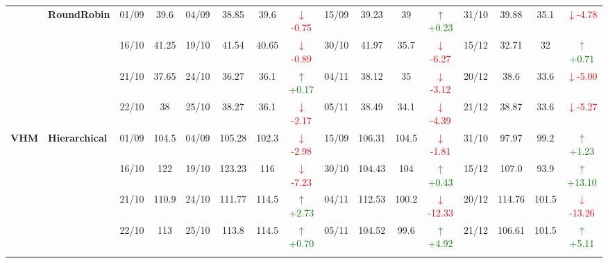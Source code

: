 {\begin{longtable}{llcc|cccc|cccc|cccc}
& \textbf{RoundRobin}
& 01/09 & 39.6 & 04/09 & 38.85 & 39.6 & \textcolor{red}{\(\downarrow\)-0.75} & 15/09 & 39.23 & 39 & \textcolor{green}{\(\uparrow\)+0.23} & 31/10 & 39.88 & 35.1 & \textcolor{red}{\(\downarrow\)-4.78} \\

&
& 16/10 & 41.25 & 19/10 & 41.54 & 40.65 & \textcolor{red}{\(\downarrow\)-0.89} & 30/10 & 41.97 & 35.7 & \textcolor{red}{\(\downarrow\)-6.27} & 15/12 & 32.71 & 32 & \textcolor{green}{\(\uparrow\)+0.71} \\

&
& 21/10 & 37.65 & 24/10 & 36.27 & 36.1 & \textcolor{green}{\(\uparrow\)+0.17} & 04/11 & 38.12 & 35 & \textcolor{red}{\(\downarrow\)-3.12} & 20/12 & 38.6 & 33.6 & \textcolor{red}{\(\downarrow\)-5.00} \\

&
& 22/10 & 38 & 25/10 & 38.27 & 36.1 & \textcolor{red}{\(\downarrow\)-2.17} & 05/11 & 38.49 & 34.1 & \textcolor{red}{\(\downarrow\)-4.39} & 21/12 & 38.87 & 33.6 & \textcolor{red}{\(\downarrow\)-5.27} \\
\midrule




\multirow{12}{*}{\textbf{VHM}} 
& \textbf{Hierarchical}
& 01/09 & 104.5 & 04/09 & 105.28 & 102.3 & \textcolor{red}{\(\downarrow\)-2.98} & 15/09 & 106.31 & 104.5 & \textcolor{red}{\(\downarrow\)-1.81} & 31/10 & 97.97 & 99.2 & \textcolor{green}{\(\uparrow\)+1.23} \\

&
& 16/10 & 122 & 19/10 & 123.23 & 116 & \textcolor{red}{\(\downarrow\)-7.23} & 30/10 & 104.43 & 104 & \textcolor{green}{\(\uparrow\)+0.43} & 15/12 & 107.0 & 93.9 & \textcolor{green}{\(\uparrow\)+13.10} \\

&
& 21/10 & 110.9 & 24/10 & 111.77 & 114.5 & \textcolor{green}{\(\uparrow\)+2.73} & 04/11 & 112.53 & 100.2 & \textcolor{red}{\(\downarrow\)-12.33} & 20/12 & 114.76 & 101.5 & \textcolor{red}{\(\downarrow\)-13.26} \\

&
& 22/10 & 113 & 25/10 & 113.8 & 114.5 & \textcolor{green}{\(\uparrow\)+0.70} & 05/11 & 104.52 & 99.6 & \textcolor{green}{\(\uparrow\)+4.92} & 21/12 & 106.61 & 101.5 & \textcolor{green}{\(\uparrow\)+5.11} \\
\cmidrule(lr){2-16}



\end{longtable}}
